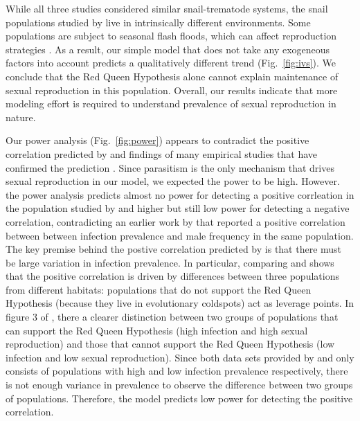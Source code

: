\documentclass{article}\usepackage[]{graphicx}\usepackage[]{color}
\newcommand{\fref}[1]{Fig.~\ref{fig:#1}}
\begin{document}
While all three studies \citep{dagan2013clonal, mckone2016fine, vergara2014infection} considered similar snail-trematode systems, the snail populations studied by \cite{dagan2013clonal} live in intrinsically different environments.
Some populations are subject to seasonal flash floods, which can affect reproduction strategies \citep{ben2007temporal}.
As a result, our simple model that does not take any exogeneous factors into account predicts a qualitatively different trend (\fref{ivs}).
We conclude that the Red Queen Hypothesis alone cannot explain maintenance of sexual reproduction in this population.
Overall, our results indicate that more modeling effort is required to understand prevalence of sexual reproduction in nature.

Our power analysis (\fref{power}) appears to contradict the positive correlation predicted by \cite{lively1992parthenogenesis, lively2001trematode} and findings of many empirical studies that have confirmed the prediction \citep{lively1987evidence, lively2002temporal, kumpulainen2004parasites, vergara2013geographic, mckone2016fine}.
Since parasitism is the only mechanism that drives sexual reproduction in our model, we expected the power to be high.
However. the power analysis predicts almost no power for detecting a positive corrleation in the population studied by \cite{vergara2014infection} and higher but still low power for detecting a negative correlation, contradicting an earlier work by \cite{vergara2013geographic} that reported a positive correlation between between infection prevalence and male frequency in the same population.
The key premise behind the postive correlation predicted by \cite{lively2001trematode} is that there must be large variation in infection prevalence.
In particular, comparing \cite{vergara2013geographic} and \cite{vergara2014infection} shows that the positive correlation is driven by differences between three populations from different habitats:
populations that do not support the Red Queen Hypothesis (because they live in evolutionary coldspots) act as leverage points. 
In figure 3 of \cite{kumpulainen2004parasites}, there a clearer distinction between two groups of populations that can support the Red Queen Hypothesis (high infection and high sexual reproduction) and those that cannot support the Red Queen Hypothesis (low infection and low sexual reproduction).
Since both data sets provided by \cite{vergara2014infection} and \cite{mckone2016fine} only consists of populations with high and low infection prevalence respectively, there is not enough variance in prevalence to observe the difference between two groups of populations.
Therefore, the model predicts low power for detecting the positive correlation.
\end{document}
